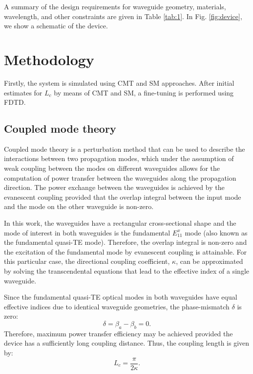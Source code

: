 \documentclass[conference]{IEEEtran}
\begin{document}
A summary of the design requirements for waveguide geometry, materials, wavelength, and other constraints are given in Table \ref{tab:1}. In Fig. \ref{fig:device}, we show a schematic of the device. 





\section{Methodology}
Firstly, the system is simulated using CMT and SM approaches. After initial estimates for $L_c$ by means of CMT and SM, a fine-tuning is performed using FDTD.



\subsection{Coupled mode theory}
Coupled mode theory is a perturbation method that can be used to describe the interactions between two propagation modes, which under the assumption of weak coupling between the modes on different waveguides allows for the computation of power transfer between the waveguides along the propagation direction. The power exchange between the waveguides is achieved by the evanescent coupling provided that the overlap integral between the input mode and the mode on the other waveguide is non-zero. 

In this work, the waveguides have a rectangular cross-sectional shape and the mode of interest in both waveguides is the fundamental $E_{11}^x$ mode (also known as the fundamental quasi-TE mode). Therefore, the overlap integral is non-zero and the excitation of the fundamental mode by evanescent coupling is attainable. For this particular case, the directional coupling coefficient, $\kappa$, can be approximated by solving the transcendental equations that lead to the effective index of a single waveguide\cite{okamoto}.

Since the fundamental quasi-TE optical modes in both waveguides have equal effective indices due to identical waveguide geometries, the phase-mismatch $\delta$ is zero:
\begin{equation}
    \delta = \beta_a - \beta_b = 0.
\end{equation}
Therefore, maximum power transfer efficiency may be achieved provided the device has a sufficiently long coupling distance. Thus, the coupling length is given by\cite{okamoto}:
\begin{equation}
    L_c = \dfrac{\pi}{2\kappa}.
\end{equation}
\end{document}
